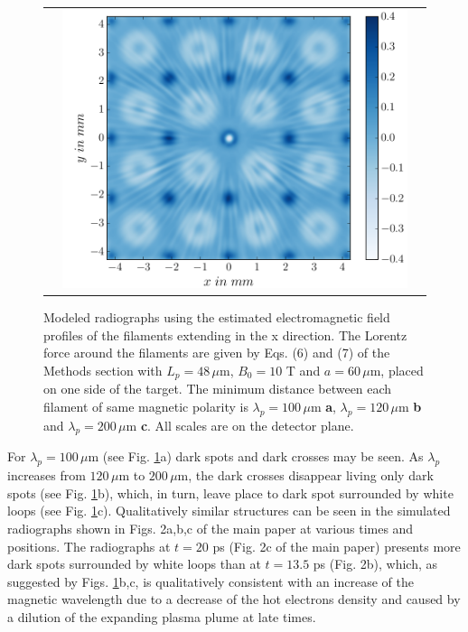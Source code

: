 \documentclass[aps,showpacs,superscriptaddress]{revtex4}
\begin{document}
\begin{figure}[ht]
{\begin{tabular}{ccc}
&\includegraphics[scale=0.18]{p_radio_conv_2D5_Alu_10T_a60_l280.png}
\end{tabular}}
\caption{\label{fig:radiosup}  
Modeled radiographs using the estimated electromagnetic field profiles of the filaments extending in the x direction.
The Lorentz force around the  filaments  are given by Eqs. (6) and (7) of the Methods section with $L_p = 48 \, \mu$m, $B_0= 10$ T and $a = 60\, \mu$m, placed on one side of the target.
The minimum distance between each filament of same magnetic polarity is $ \lambda_p =100\, \mu$m  \textbf{a}, $ \lambda_p =120\, \mu$m \textbf{b} and $ \lambda_p =200\, \mu$m   \textbf{c}.
All scales are on the detector plane.
}
\end{figure}
For  $ \lambda_p =100\, \mu$m (see Fig. \ref{fig:radiosup}a)  dark spots and dark crosses  may be seen. As  $ \lambda_p$ increases from $120\, \mu$m  to   $ 200\, \mu$m, the dark crosses disappear living only dark spots (see Fig. \ref{fig:radiosup}b), which, in turn, leave place to dark spot surrounded by white loops (see Fig. \ref{fig:radiosup}c). Qualitatively similar structures can be seen in the simulated radiographs shown in Figs. 2a,b,c of the main paper at various times and positions. 
The radiographs at $t =20$ ps  (Fig. 2c of the main paper) presents more dark spots surrounded by white loops than at $t= 13.5$ ps  (Fig. 2b),  which, as suggested by Figs. \ref{fig:radiosup}b,c, is qualitatively consistent with an increase of the magnetic wavelength due to a decrease of the hot electrons density and caused by a dilution of the expanding plasma plume at late times.
\end{document}
